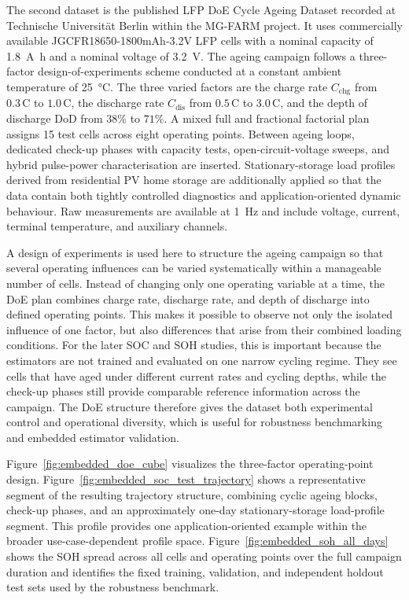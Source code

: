 \documentclass[
    a4paper,
    12pt,
    titlepage,
    bibliography=totoc,
    twoside=on,
    parskip=false,
    numbers=noenddot,
    cleardoublepage=empty,
    DIV=12,
    BCOR=12.0mm,
    headheight=36pt,
    headings=openright
]{scrreprt}
\begin{document}
The second dataset is the published LFP DoE Cycle Ageing Dataset recorded at Technische Universit\"at Berlin within the MG-FARM project.\autocite{lfpDoeCycleAgingDataset2025} It uses commercially available JGCFR18650-1800mAh-3.2V LFP cells with a nominal capacity of \SI{1.8}{\ampere\hour} and a nominal voltage of \SI{3.2}{\volt}. The ageing campaign follows a three-factor design-of-experiments scheme conducted at a constant ambient temperature of \SI{25}{\celsius}. The three varied factors are the charge rate $C_\mathrm{chg}$ from $0.3\,\mathrm{C}$ to $1.0\,\mathrm{C}$, the discharge rate $C_\mathrm{dis}$ from $0.5\,\mathrm{C}$ to $3.0\,\mathrm{C}$, and the depth of discharge $\mathrm{DoD}$ from $38\%$ to $71\%$. A mixed full and fractional factorial plan assigns 15 test cells across eight operating points. Between ageing loops, dedicated check-up phases with capacity tests, open-circuit-voltage sweeps, and hybrid pulse-power characterisation are inserted. Stationary-storage load profiles derived from residential PV home storage are additionally applied so that the data contain both tightly controlled diagnostics and application-oriented dynamic behaviour. Raw measurements are available at \SI{1}{\hertz} and include voltage, current, terminal temperature, and auxiliary channels.

A design of experiments is used here to structure the ageing campaign so that several operating influences can be varied systematically within a manageable number of cells.\autocite{siebertzStatistischeVersuchsplanung2017} Instead of changing only one operating variable at a time, the DoE plan combines charge rate, discharge rate, and depth of discharge into defined operating points. This makes it possible to observe not only the isolated influence of one factor, but also differences that arise from their combined loading conditions. For the later SOC and SOH studies, this is important because the estimators are not trained and evaluated on one narrow cycling regime. They see cells that have aged under different current rates and cycling depths, while the check-up phases still provide comparable reference information across the campaign. The DoE structure therefore gives the dataset both experimental control and operational diversity, which is useful for robustness benchmarking and embedded estimator validation.

Figure~\ref{fig:embedded_doe_cube} visualizes the three-factor operating-point design. Figure~\ref{fig:embedded_soc_test_trajectory} shows a representative segment of the resulting trajectory structure, combining cyclic ageing blocks, check-up phases, and an approximately one-day stationary-storage load-profile segment. This profile provides one application-oriented example within the broader use-case-dependent profile space. Figure~\ref{fig:embedded_soh_all_days} shows the SOH spread across all cells and operating points over the full campaign duration and identifies the fixed training, validation, and independent holdout test sets used by the robustness benchmark.
\end{document}
